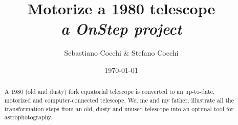 \documentclass{article}
\title{\textbf{Motorize a 1980 telescope}\\\textit{a OnStep project}}
\author{Sebastiano Cocchi \& Stefano Cocchi}
\date{\today}
\begin{document}
    
    \maketitle

    \begin{abstract}
        A 1980 (old and dusty) fork equatorial telescope is converted to an up-to-date, motorized and computer-connected telescope.
        We, me and my father, illustrate all the transformation steps from an old, dusty and unused telescope into an optimal tool for astrophotography.
    \end{abstract}

\end{document}
